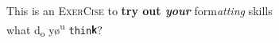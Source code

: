 \documentclass[a4paper]{report}
\begin{document}
This is an \textsc{ExerCise} to \textbf{try out \textit{your}} form\textit{atting} skills \textemdash \\what d\textsubscript{o} y\o \textsuperscript{u} \texttt{thin\textbf{k}}?
\end{document}
